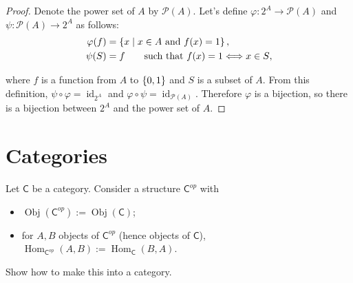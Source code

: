 \begin{proof}
	Denote the power set of $A$ by $\mathscr{P}(A)$. Let's define $\varphi: 2^{A}\to \mathscr{P}(A)$ and $\psi: \mathscr{P}(A)\to 2^{A}$ as follows:
	\begin{align*}
		\varphi(f) & = \left\{{x \mid x\in A \text{ and } f(x) = 1}\right\},                      \\
		\psi(S)    & = f \qquad\text{such that $f(x) = 1 \Longleftrightarrow x\in S$},
	\end{align*}

	where $f$ is a function from $A$ to $\left\{{0, 1}\right\}$ and $S$ is a subset of $A$. From this definition, $\psi\circ\varphi = \operatorname{id}_{2^{A}}$ and $\varphi\circ\psi = \operatorname{id}_{\mathscr{P}(A)}$. Therefore $\varphi$ is a bijection, so there is a bijection between $2^{A}$ and the power set of $A$.
\end{proof}

\section{Categories}

\begin{exercise}{3.1}
	Let $\mathsf{C}$ be a category. Consider a structure ${\mathsf{C}}^{op}$ with
	\begin{itemize}
		\item $\operatorname{Obj}({\mathsf{C}}^{op}) := \operatorname{Obj}(\mathsf{C})$;
		\item for $A, B$ objects of ${\mathsf{C}}^{op}$ (hence objects of $\mathsf{C}$), $\operatorname{Hom}_{{\mathsf{C}}^{op}}(A, B) := \operatorname{Hom}_{\mathsf{C}}(B, A)$.
	\end{itemize}

	Show how to make this into a category.
\end{exercise}

